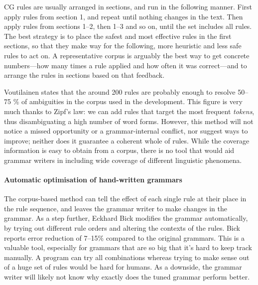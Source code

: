 CG rules are usually arranged in sections, and run in the following manner. 
First apply rules from section 1, and repeat until nothing changes in the text. Then apply rules from sections 1--2, then 1--3 and so on, until the set includes all rules.
The best strategy is to place the safest and most effective rules in the first sections,
so that they make way for the following, more heuristic and less safe rules to act on.
A representative corpus is arguably the best way to get concrete numbers---how many times a rule applied and how often it was correct---and to arrange the rules in sections based on that feedback.

Voutilainen \cite{voutilainen2004} states that the around 200 rules are probably enough to resolve 50--75 \% of ambiguities in the corpus used in the development. 
This figure is very much thanks to Zipf's law: we can add rules that target the most frequent \emph{tokens}, thus disambiguating a high number of word forms.
However, this method will not notice a missed opportunity or a grammar-internal conflict, nor suggest ways to improve; neither does it guarantee a coherent whole of rules. 
While the coverage information is easy to obtain from a corpus, there is no tool that would aid grammar writers in including wide coverage of different linguistic phenomena.


\paragraph{Automatic optimisation of hand-written grammars }

The corpus-based method can tell the effect of each single rule at their place in the rule sequence, and leaves the grammar writer to make changes in the grammar.
As a step further, Eckhard Bick \cite{bick2013tuning} modifies the grammar automatically, by trying
out different rule orders and altering the contexts of the rules. 
Bick reports error reduction of 7--15\% compared to the original grammars.
This is a valuable tool, especially for grammars that are so big that it's hard to keep track manually. A program can try all combinations whereas trying to make sense out of a huge set of rules would be hard for humans.
As a downside, the grammar writer will likely not know why exactly does the tuned grammar perform better.



